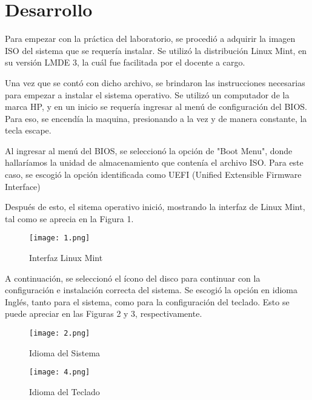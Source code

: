 \documentclass[
  letterpaper, 
  maincolor=black,
  sectioncolor=black!90,
  subsectioncolor=black!70,
  itemtextcolor=black!40,
]{fortysecondscv}
\begin{document}
\newpage
\section{Desarrollo}
{\Large 
Para empezar con la práctica del laboratorio, se procedió a adquirir la imagen ISO del sistema que se requería instalar. Se utilizó la distribución Linux Mint, en su versión LMDE 3, la cuál fue facilitada por el docente a cargo.}

{\Large 
Una vez que se contó con dicho archivo, se brindaron las instrucciones necesarias para empezar a instalar el sistema operativo. Se utilizó un computador de la marca HP, y en un inicio se requería ingresar al menú de configuración del BIOS. Para eso, se encendía la maquina, presionando a la vez y de manera constante, la tecla escape.}

{\Large 
Al ingresar al menú del BIOS, se seleccionó la opción de "Boot Menu", donde hallaríamos la unidad de almacenamiento que contenía el archivo ISO. Para este caso, se escogió la opción identificada como UEFI (Unified Extensible Firmware Interface)}

{\Large 
Después de esto, el sitema operativo inició, mostrando la interfaz de Linux Mint, tal como se aprecia en la Figura 1.}

\begin{center}
    \begin{figure}[H]
    \centering
    \texttt{[image: 1.png]}
    \caption{Interfaz Linux Mint}
    \label{fig:1.png}
    \end{figure}
\end{center}

{\Large
A continuación, se seleccionó el ícono del disco para continuar con la configuración e instalación correcta del sistema. Se escogió la opción en idioma Inglés, tanto para el sistema, como para la configuración del teclado. Esto se puede apreciar en las Figuras 2 y 3, respectivamente.}

\begin{center}
    \begin{figure}[H]
    \centering
    \texttt{[image: 2.png]}
    \caption{Idioma del Sistema}
    \label{fig:2.png}
    \end{figure}
\end{center}

\begin{center}
    \begin{figure}[H]
    \centering
    \texttt{[image: 4.png]}
    \caption{Idioma del Teclado}
    \label{fig:4.png}
    \end{figure}
\end{center}
\end{document}
